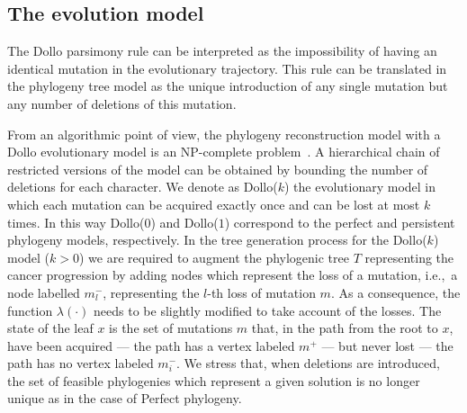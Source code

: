 \documentclass[a4paper,USenglish]{article}
\newcommand{\ie}{i.e.,~}
\theoremstyle{definition}
\begin{document}
\subsection{The evolution model}
\label{sec:intro_dollok}
The Dollo parsimony rule can be interpreted as the impossibility of 
having an identical mutation in the
evolutionary trajectory.
This rule can be translated in the phylogeny tree model as the unique introduction of 
any single mutation but any number of deletions of this mutation. 

From an algorithmic point of view,
the phylogeny reconstruction model 
with a Dollo evolutionary model is 
an NP-complete problem~\cite{BKW95,DAY198633}.
A hierarchical chain of restricted versions of the model can be obtained by bounding the number of deletions for each character.
We denote as Dollo($k$) the evolutionary model in which each mutation can be acquired exactly once and can be lost at most $k$ times. 
In this way Dollo($0$) and Dollo($1$) correspond to the perfect and persistent phylogeny models, respectively.
In the tree generation process for the Dollo($k$) model ($k>0$) we are required to augment
the phylogenic tree $T$ representing the cancer progression by adding nodes which
represent the loss of a mutation, \ie a node labelled $m^-_l$, representing the $l$-th
loss of mutation $m$.  
As a consequence, the function $\lambda(\cdot)$ needs to be slightly modified to take
account of the losses.
The state of the leaf $x$ is  the set of  mutations $m$ that, in the path from the root to
$x$, have been acquired --- the path has a vertex labeled $m^{+}$ --- but never lost ---
the path has no vertex labeled $m_{i}^{-}$.
We stress  that, when deletions are introduced, 
the set of feasible phylogenies which represent a given solution is no longer unique as in
the case of Perfect phylogeny.
\end{document}

